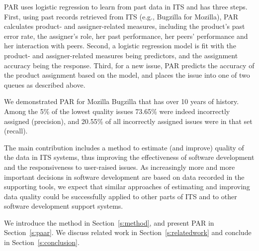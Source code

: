 \documentclass{sig-alternate}
\begin{document}
PAR uses logistic regression to learn from past data in ITS and has
three steps. First, using past records retrieved from ITS (e.g.,
Bugzilla for Mozilla), PAR calculates product- and
assigner-related measures, including the product's past error rate,
the assigner's role, her past performance, her peers' performance
and her interaction with peers.
Second, a logistic regression model is fit with
the product- and assigner-related measures being predictors, and the
assignment accuracy being the response. Third, for a new issue, PAR
predicts the accuracy of the product assignment based on the model,
and places the issue into one of two queues as described above.

We demonstrated PAR for Mozilla Bugzilla that has over 10 years of
history. Among the 5\% of the lowest quality issues
73.65\% were indeed incorrectly assigned (precision), and 20.55\% of
all incorrectly assigned issues were in
that set (recall).

The main contribution includes a method to estimate (and improve)
quality of the data in ITS systems, thus improving the effectiveness
of software development and the responsiveness to user-raised
issues.
As increasingly more
and more important decisions in software development are based on
data recorded in the supporting tools, we expect that similar
approaches of estimating and improving data quality could be
successfully applied to other parts of ITS and to other software
development support systems.

We introduce the method in Section~\ref{s:method},
and present PAR in Section~\ref{s:paar}.
We discuss related work in Section~\ref{s:relatedwork} and
conclude in Section~\ref{s:conclusion}.

\vspace{-.275cm}
\end{document}
